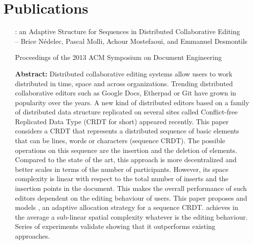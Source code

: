 
\section{Publications}

\begin{itemize}
\item [\LSEQ: an Adaptive Structure for Sequences in Distributed Collaborative
  Editing]\ \\-- Brice Nédelec, Pascal Molli, Achour Mostefaoui, and Emmanuel
  Desmontils
\item [Proceedings of the 2013 ACM Symposium on Document Engineering]
\item [\textbf{Abstract:}] {\small Distributed collaborative editing systems
    allow users to work distributed in time, space and across
    organizations. Trending distributed collaborative editors such as Google
    Docs, Etherpad or Git have grown in popularity over the years. A new kind of
    distributed editors based on a family of distributed data structure
    replicated on several sites called Conflict-free Replicated Data Type (CRDT
    for short) appeared recently. This paper considers a CRDT that represents a
    distributed sequence of basic elements that can be lines, words or
    characters (sequence CRDT). The possible operations on this sequence are the
    insertion and the deletion of elements. Compared to the state of the art,
    this approach is more decentralized and better scales in terms of the number
    of participants. However, its space complexity is linear with respect to the
    total number of inserts and the insertion points in the document. This makes
    the overall performance of such editors dependent on the editing behaviour
    of users. This paper proposes and models \LSEQ, an adaptive allocation
    strategy for a sequence CRDT. \LSEQ achieves in the average a sub-linear
    spatial complexity whatever is the editing behaviour. Series of experiments
    validate \LSEQ showing that it outperforms existing approaches.}

\end{itemize}

